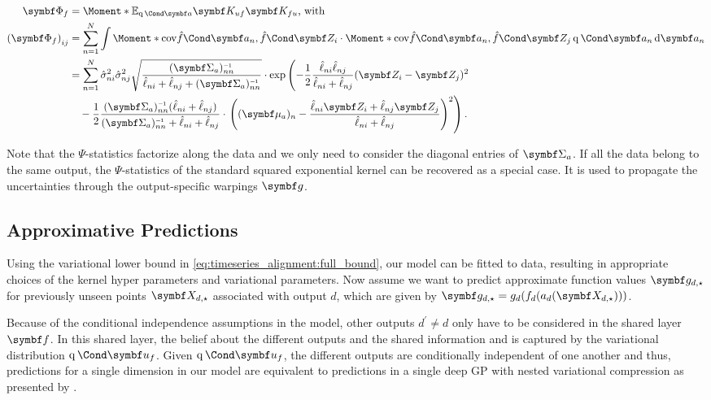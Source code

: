 \begin{align}
    \begin{split}
        \mat{\Phi_f} &= \Moment*{\E_{\Variat{\rv{a}}}}{\mat{K_{uf}}\mat{K_{fu}}}\text{, with} \\
        \left(\mat{\Phi_f} \right)_{ij} &= \sum_{n=1}^N \int \Moment*{\cov}{\Fun{\hat{f}}{\mat{a_n}}, \Fun{\hat{f}}{\mat{Z_i}}}
        \cdot \Moment*{\cov}{\Fun{\hat{f}}{\mat{a_n}}, \Fun{\hat{f}}{\mat{Z_j}}} \Variat{\rv{a_n}} \diff \rv{a_n} \\
        &= \sum_{n=1}^N \hat{\sigma}_{ni}^2 \hat{\sigma}_{nj}^2 \sqrt{\frac{(\mat{\Sigma_a})_{nn}\inv}{\hat{\ell}_{ni} + \hat{\ell}_{nj} + (\mat{\Sigma_a})_{nn}\inv}}
        \cdot \exp\left( -\frac{1}{2} \frac{\hat{\ell}_{ni}\hat{\ell}_{nj}}{\hat{\ell}_{ni} + \hat{\ell}_{nj}} (\mat{Z_i} - \mat{Z_j})^2 \right. \\
        &\quad {} - \frac{1}{2} \frac{(\mat{\Sigma_a})_{nn}\inv(\hat{\ell}_{ni} + \hat{\ell}_{nj})}{(\mat{\Sigma_a})_{nn}\inv + \hat{\ell}_{ni} + \hat{\ell}_{nj}}
        \cdot \left.\left( (\mat{\mu_a})_n - \frac{\hat{\ell}_{ni} \mat{Z_i} + \hat{\ell}_{nj} \mat{Z_j}}{\hat{\ell}_{ni} + \hat{\ell}_{nj}} \right)^2 \right).
    \end{split}
\end{align}

Note that the $\Psi$-statistics factorize along the data and we only need to consider the diagonal entries of $\mat{\Sigma_a}$.
If all the data belong to the same output, the $\Psi$-statistics of the standard squared exponential kernel can be recovered as a special case.
It is used to propagate the uncertainties through the output-specific warpings $\rv{g}$.


\subsection{Approximative Predictions}
\label{sub:timeseries_alignment:predictions}
Using the variational lower bound in \cref{eq:timeseries_alignment:full_bound}, our model can be fitted to data, resulting in appropriate choices of the kernel hyper parameters and variational parameters.
Now assume we want to predict approximate function values $\mat{g_{d, \star}}$ for previously unseen points $\mat{X_{d, \star}}$ associated with output $d$, which are given by $ \mat{g_{d, \star}} = g_d(f_d(a_d(\mat{X_{d, \star}})))$.

Because of the conditional independence assumptions in the model, other outputs $d^\prime \neq d$ only have to be considered in the shared layer $\rv{f}$.
In this shared layer, the belief about the different outputs and the shared information and is captured by the variational distribution $\Variat{\rv{u_f}}$.
Given $\Variat{\rv{u_f}}$, the different outputs are conditionally independent of one another and thus, predictions for a single dimension in our model are equivalent to predictions in a single deep GP with nested variational compression as presented by \textcite{hensman_nested_2014}.

